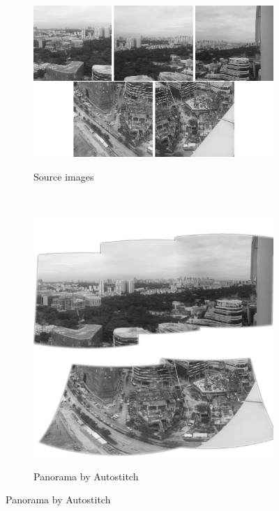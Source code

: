 \documentclass{article}
\begin{document}
\begin{figure}[h]
	\begin{subfigure}[t]{0.8\textwidth}
		\centering
		\includegraphics[width=\textwidth]{images/pano_narrow}
        \label{fig:pano_images}
		\caption{Source images}
    \end{subfigure}%
	\\
	\centering
	\begin{subfigure}{0.4\textwidth}
		\includegraphics[width=\textwidth]{images/panorama-autostitch}
        \label{fig:pano_autostitch}
		\caption{Panorama by Autostitch}

\end{subfigure}
\end{figure}
\end{document}

